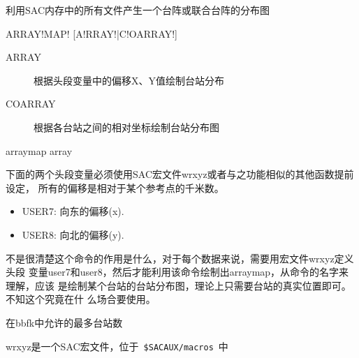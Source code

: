 \label{cmd:arraymap}

利用SAC内存中的所有文件产生一个台阵或联合台阵的分布图

\begin{SACSTX}
ARRAY!MAP! [A!RRAY!|C!OARRAY!]
\end{SACSTX}

\begin{description}
\item [ARRAY] 根据头段变量中的偏移X、Y值绘制台站分布
\item [COARRAY] 根据各台站之间的相对坐标绘制台站分布图
\end{description}

\begin{SACDFT}
arraymap array
\end{SACDFT}

下面的两个头段变量必须使用SAC宏文件wrxyz或者与之功能相似的其他函数提前设定，
所有的偏移是相对于某个参考点的千米数。
\begin{itemize}
\item USER7: 向东的偏移(x).
\item USER8: 向北的偏移(y).
\end{itemize}

不是很清楚这个命令的作用是什么，对于每个数据来说，需要用宏文件wrxyz定义头段
变量user7和user8，然后才能利用该命令绘制出arraymap，从命令的名字来理解，应该
是绘制某个台站的台站分布图，理论上只需要台站的真实位置即可。不知这个究竟在什
么场合要使用。

在bbfk中允许的最多台站数

wrxyz是一个SAC宏文件，位于~\verb+$SACAUX/macros+~中

